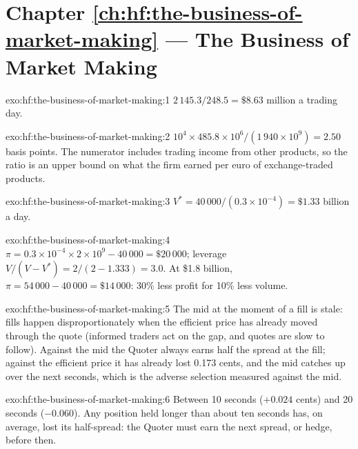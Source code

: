 \section*{Chapter \ref{ch:hf:the-business-of-market-making} --- The Business of Market Making}

\begin{solution}{exo:hf:the-business-of-market-making:1}
$2\,145.3/248.5=\$8.63$ million a trading day.
\end{solution}

\begin{solution}{exo:hf:the-business-of-market-making:2}
$10^4\times485.8\times10^6/(1\,940\times10^9)=2.50$ basis points. The numerator includes trading income from other products, so the ratio is an
upper bound on what the firm earned per euro of exchange-traded products.
\end{solution}

\begin{solution}{exo:hf:the-business-of-market-making:3}
$V^\ast=40\,000/(0.3\times10^{-4})=\$1.33$ billion a day.
\end{solution}

\begin{solution}{exo:hf:the-business-of-market-making:4}
$\pi=0.3\times10^{-4}\times2\times10^9-40\,000=\$20\,000$; leverage $V/(V-V^\ast)=2/(2-1.333)=3.0$. At \$1.8 billion, $\pi=54\,000-40\,000=
\$14\,000$: 30\% less profit for 10\% less volume.
\end{solution}

\begin{solution}{exo:hf:the-business-of-market-making:5}
The mid at the moment of a fill is stale: fills happen disproportionately when the efficient price has already moved through the quote (informed
traders act on the gap, and quotes are slow to follow). Against the mid the Quoter always earns half the spread at the fill; against the efficient
price it has already lost 0.173 cents, and the mid catches up over the next seconds, which is the adverse selection measured against the mid.
\end{solution}

\begin{solution}{exo:hf:the-business-of-market-making:6}
Between 10 seconds ($+0.024$ cents) and 20 seconds ($-0.060$). Any position held longer than about ten seconds has, on average, lost its half-spread:
the Quoter must earn the next spread, or hedge, before then.
\end{solution}

